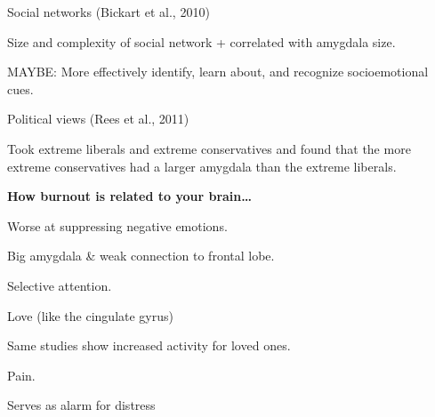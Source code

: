 \begin{coloredlist}
\begin{coloredlist}
\begin{coloredlist}
\begin{coloredlist}
                \begin{coloredlist}
                    \item Social networks (Bickart et al., 2010)
                    \begin{coloredlist}
                        \item Size and complexity of social network + correlated with amygdala size.
                        \item MAYBE: More effectively identify, learn about, and recognize socioemotional cues.
                    \end{coloredlist}
                    \item Political views (Rees et al., 2011)
                    \begin{coloredlist}
                        \item Took extreme liberals and extreme conservatives and found that the more extreme conservatives had a larger amygdala than the extreme liberals.
                    \end{coloredlist}
                \end{coloredlist}
                \item \textbf{How burnout is related to your brain\ldots}
                \begin{coloredlist}
                    \item Worse at suppressing negative emotions.
                    \item Big amygdala \& weak connection to frontal lobe.
                \end{coloredlist}
            \end{coloredlist}
        \end{coloredlist}
        \item {}
        \begin{coloredlist}
            \item Selective attention.
            \item Love (like the cingulate gyrus)
            \begin{coloredlist}
                \item Same studies show increased activity for loved ones.
            \end{coloredlist}
            \item Pain.
            \begin{coloredlist}
                \item Serves as alarm for distress

\end{coloredlist}
\end{coloredlist}
\end{coloredlist}
\end{coloredlist}
